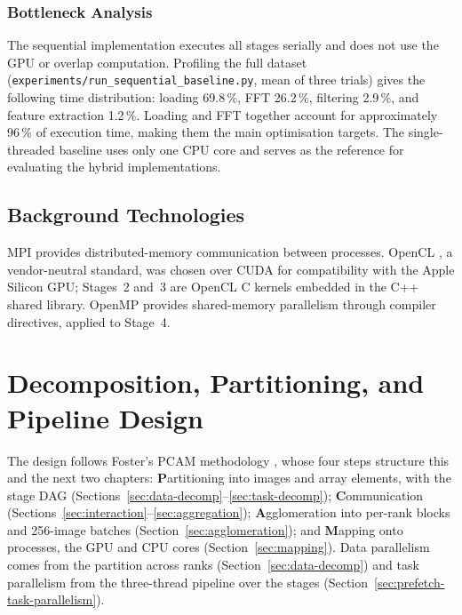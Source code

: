\documentclass[a4paper,12pt]{report}
\begin{document}
\subsection{Bottleneck Analysis}

The sequential implementation executes all stages serially and does not use the
GPU or overlap computation. Profiling the full dataset
(\texttt{experiments\slash{}run\_\discretionary{}{}{}sequential\_\discretionary{}{}{}baseline.py},
mean of three trials) gives the following time distribution: loading 69.8\,\%,
FFT 26.2\,\%, filtering 2.9\,\%, and feature extraction 1.2\,\%. Loading and FFT
together account for approximately 96\,\% of execution time, making them the main
optimisation targets. The single-threaded baseline uses only one CPU core and
serves as the reference for evaluating the hybrid implementations.

\section{Background Technologies}
\label{sec:technologies}

MPI \cite{mpiforum2021} provides distributed-memory communication between
processes. OpenCL \cite{stone2010}, a vendor-neutral standard, was chosen over CUDA
for compatibility with the Apple Silicon GPU; Stages~2 and~3 are OpenCL C kernels
embedded in the C++ shared library. OpenMP \cite{openmpARB2018} provides
shared-memory parallelism through compiler directives, applied to Stage~4.

\chapter{Decomposition, Partitioning, and Pipeline Design}
\label{chap:decomp}

The design follows Foster's PCAM methodology \cite{foster1995}, whose
four steps structure this and the next two chapters:
\textbf{P}artitioning into images and array elements, with the stage DAG
(Sections~\ref{sec:data-decomp}--\ref{sec:task-decomp});
\textbf{C}ommunication (Sections~\ref{sec:interaction}--\ref{sec:aggregation});
\textbf{A}gglomeration into per-rank blocks and 256-image batches
(Section~\ref{sec:agglomeration}); and \textbf{M}apping onto processes,
the GPU and CPU cores (Section~\ref{sec:mapping}). Data parallelism comes
from the partition across ranks (Section~\ref{sec:data-decomp}) and task
parallelism from the three-thread pipeline over the stages
(Section~\ref{sec:prefetch-task-parallelism}).
\end{document}
